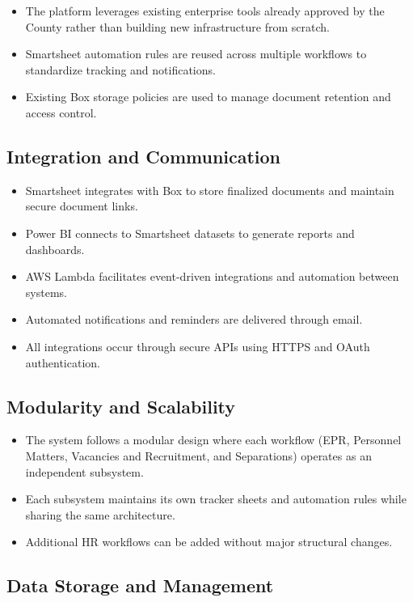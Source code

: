 \documentclass[12pt]{article}
\begin{document}
\begin{itemize}
    \item The platform leverages existing enterprise tools already approved by the County rather than building new infrastructure from scratch.
    \item Smartsheet automation rules are reused across multiple workflows to standardize tracking and notifications.
    \item Existing Box storage policies are used to manage document retention and access control.
\end{itemize}

\subsection{Integration and Communication}

\begin{itemize}
    \item Smartsheet integrates with Box to store finalized documents and maintain secure document links.
    \item Power BI connects to Smartsheet datasets to generate reports and dashboards.
    \item AWS Lambda facilitates event-driven integrations and automation between systems.
    \item Automated notifications and reminders are delivered through email.
    \item All integrations occur through secure APIs using HTTPS and OAuth authentication.
\end{itemize}

\subsection{Modularity and Scalability}

\begin{itemize}
    \item The system follows a modular design where each workflow (EPR, Personnel Matters, Vacancies and Recruitment, and Separations) operates as an independent subsystem.
    \item Each subsystem maintains its own tracker sheets and automation rules while sharing the same architecture.
    \item Additional HR workflows can be added without major structural changes.
\end{itemize}

\subsection{Data Storage and Management}
\end{document}
